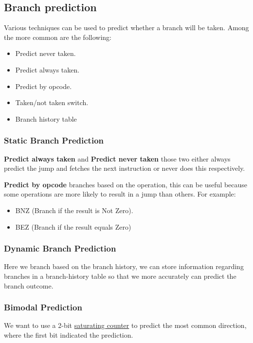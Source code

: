 \subsection{Branch prediction}
Various techniques can be used to predict whether a branch will be taken. Among the more common are the following:

\begin{itemize}
\item Predict never taken.
\item Predict always taken.
\item Predict by opcode.
\item Taken/not taken switch.
\item Branch history table
\end{itemize}



\subsubsection{Static Branch Prediction}
\textbf{Predict always taken} and \textbf{Predict never taken} those two either always predict the jump and fetches the next instruction or never does this respectively.

\textbf{Predict by opcode} branches based on the operation, this can be useful because some operations are more likely to result in a jump than others. For example: \\
\begin{itemize}
\item BNZ (Branch if the result is Not Zero).
\item BEZ (Branch if the result equals Zero)
\end{itemize}
\subsubsection{Dynamic Branch Prediction}
Here we branch based on the branch history, we can store information regarding branches in a branch-history table so that we more accurately can predict the branch outcome.

\subsubsection{Bimodal Prediction}
We want to use a 2-bit \underline{saturating counter} to predict the most common direction, where the first bit indicated the prediction. \\

